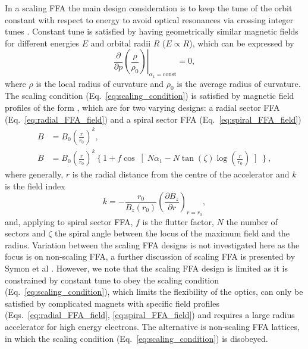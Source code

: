 \documentclass[../main.tex]{subfiles}
\begin{document}
In a scaling FFA the main design consideration is to keep the tune of the orbit constant with respect to energy to avoid optical resonances via crossing integer tunes \cite{symon1956fixed}. Constant tune is satisfied by having geometrically similar magnetic fields for different energies $E$ and orbital radii $R$ ($E\propto R$), which can be expressed by
\begin{equation}
\left.\frac{\partial}{\partial p} \left(\frac{\rho}{\rho_{0}}\right)\right|_{\alpha_{1}=\mathrm{const}}=0,
\label{eq:scaling_condition}    
\end{equation}
where $\rho$ is the local radius of curvature and $\rho_{0}$ is the average radius of curvature. The scaling condition (Eq.~\ref{eq:scaling_condition}) is satisfied by magnetic field profiles of the form \cite{symon1956fixed}, which are for two varying designs: a radial sector FFA (Eq.~\ref{eq:radial_FFA_field}) and a spiral sector FFA (Eq.~\ref{eq:spiral_FFA_field})
\begin{align}
B &= B_{0}\left(\frac{r}{r_{0}}\right)^{k}, 
\label{eq:radial_FFA_field} \\
B &= B_{0}\left(\frac{r}{r_{0}}\right)^{k}\left\{1+f\cos\right[N\alpha_{1}-N\tan\left(\zeta\right)\log\left(\frac{r}{r_{0}}\right)\left]\right\},
\label{eq:spiral_FFA_field}
\end{align}
where generally, $r$ is the radial distance from the centre of the accelerator and $k$ is the field index
\begin{equation}
k=-\frac{r_{0}}{B_{z}\left(r_{0}\right)}\left(\frac{\partial B_{z}}{\partial r}\right)_{r=r_{0}},
\label{eq:FFAG_field_index}
\end{equation}
and, applying to spiral sector FFA, $f$ is the flutter factor, $N$ the number of sectors and $\zeta$ the spiral angle between the locus of the maximum field and the radius. Variation between the scaling FFA designs is not investigated here as the focus is on non-scaling FFA, a further discussion of scaling FFA is presented by Symon et al \cite{symon1956fixed}. However, we note that the scaling FFA design is limited as it is constrained by constant tune to obey the scaling condition (Eq.~\ref{eq:scaling_condition}), which limits the flexibility of the optics, can only be satisfied by complicated magnets with specific field profiles (Eqs.~\ref{eq:radial_FFA_field}, \ref{eq:spiral_FFA_field}) and requires a large radius accelerator for high energy electrons. The alternative is non-scaling FFA lattices, in which the scaling condition (Eq.~\ref{eq:scaling_condition}) is disobeyed.
\end{document}
